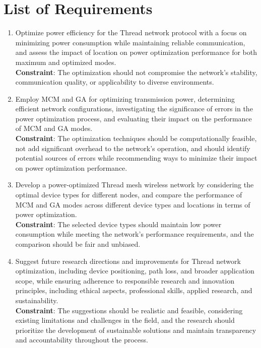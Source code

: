 \section{List of Requirements}\label{sec:list_of_requirements}
\begin{enumerate}
    \item Optimize power efficiency for the Thread network protocol with a focus on minimizing power consumption while maintaining reliable communication, and assess the impact of location on power optimization performance for both maximum and optimized modes.\\
    \textbf{Constraint}: The optimization should not compromise the network's stability, communication quality, or applicability to diverse environments.
    \item Employ \gls{MCM} and \gls{GA} for optimizing transmission power, determining efficient network configurations, investigating the significance of errors in the power optimization process, and evaluating their impact on the performance of \gls{MCM} and \gls{GA} modes.\\
    \textbf{Constraint}: The optimization techniques should be computationally feasible, not add significant overhead to the network's operation, and should identify potential sources of errors while recommending ways to minimize their impact on power optimization performance.
    \item Develop a power-optimized Thread mesh wireless network by considering the optimal device types for different nodes, and compare the performance of \gls{MCM} and \gls{GA} modes across different device types and locations in terms of power optimization.\\
    \textbf{Constraint}: The selected device types should maintain low power consumption while meeting the network's performance requirements, and the comparison should be fair and unbiased.
    \item Suggest future research directions and improvements for Thread network optimization, including device positioning, path loss, and broader application scope, while ensuring adherence to responsible research and innovation principles, including ethical aspects, professional skills, applied research, and sustainability.\\
    \textbf{Constraint}: The suggestions should be realistic and feasible, considering existing limitations and challenges in the field, and the research should prioritize the development of sustainable solutions and maintain transparency and accountability throughout the process.
\end{enumerate}


